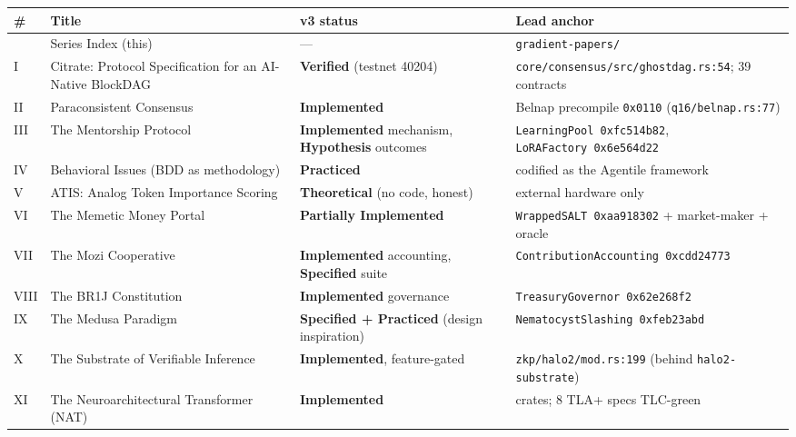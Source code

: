 {\def\LTcaptype{none} %
\begin{longtable}[]{@{}
  >{\raggedright\arraybackslash}p{}
  >{\raggedright\arraybackslash}p{}
  >{\raggedright\arraybackslash}p{}
  >{\raggedright\arraybackslash}p{}@{}}
\toprule\noalign{}
\begin{minipage}[b]{\linewidth}\raggedright
\#
\end{minipage} & \begin{minipage}[b]{\linewidth}\raggedright
Title
\end{minipage} & \begin{minipage}[b]{\linewidth}\raggedright
v3 status
\end{minipage} & \begin{minipage}[b]{\linewidth}\raggedright
Lead anchor
\end{minipage} \\
\midrule\noalign{}
\endhead
\bottomrule\noalign{}
\endlastfoot
0 & Series Index (this) & --- & \texttt{gradient-papers/} \\
I & Citrate: Protocol Specification for an AI-Native BlockDAG &
\textbf{Verified} (testnet 40204) &
\texttt{core/consensus/src/ghostdag.rs:54}; 39 contracts \\
II & Paraconsistent Consensus & \textbf{Implemented} & Belnap precompile
\texttt{0x0110} (\texttt{q16/belnap.rs:77}) \\
III & The Mentorship Protocol & \textbf{Implemented} mechanism,
\textbf{Hypothesis} outcomes & \texttt{LearningPool\ 0xfc514b82},
\texttt{LoRAFactory\ 0x6e564d22} \\
IV & Behavioral Issues (BDD as methodology) & \textbf{Practiced} &
codified as the Agentile framework \\
V & ATIS: Analog Token Importance Scoring & \textbf{Theoretical} (no
code, honest) & external hardware only \\
VI & The Memetic Money Portal & \textbf{Partially Implemented} &
\texttt{WrappedSALT\ 0xaa918302} + market-maker + oracle \\
VII & The Mozi Cooperative & \textbf{Implemented} accounting,
\textbf{Specified} suite &
\texttt{ContributionAccounting\ 0xcdd24773} \\
VIII & The BR1J Constitution & \textbf{Implemented} governance &
\texttt{TreasuryGovernor\ 0x62e268f2} \\
IX & The Medusa Paradigm & \textbf{Specified + Practiced} (design
inspiration) & \texttt{NematocystSlashing\ 0xfeb23abd} \\
X & The Substrate of Verifiable Inference & \textbf{Implemented},
feature-gated & \texttt{zkp/halo2/mod.rs:199} (behind
\texttt{halo2-substrate}) \\
XI & The Neuroarchitectural Transformer (NAT) & \textbf{Implemented} &
15 crates; 8 TLA+ specs TLC-green \\
\end{longtable}
}

